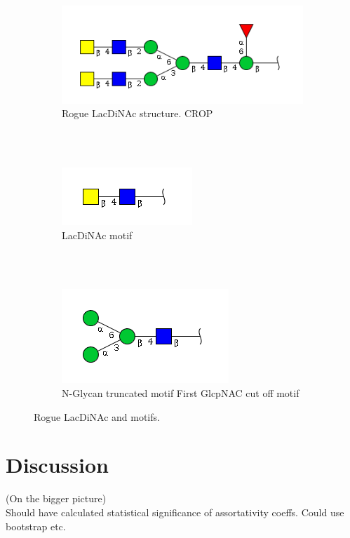 \documentclass[12pt,a4paper]{article}
\begin{document}
\begin{figure}[ht!]
    \centering
    \begin{subfigure}[t]{1.0\textwidth}
        \centering
        \includegraphics[scale=0.6]{trees/rogue_LacDiNAc_structure.png}
        \caption{Rogue LacDiNAc structure. CROP}
    \end{subfigure}%
    \\
    \bigbreak
    ~ 
	\\
    \begin{subfigure}[t]{1.0\textwidth}
        \centering
        \includegraphics[scale=0.6]{trees/LacDiNAc_motif.png}
        \caption{LacDiNAc motif}
    \end{subfigure}
    \\
    \bigbreak
    ~ 
	\\
    \begin{subfigure}[t]{1.0\textwidth}
        \centering
        \includegraphics[scale=0.6]{trees/N-Glycan_truncated_motif__First_GlcpNAC_cut_off_motif.png}
        \caption{N-Glycan truncated motif First GlcpNAC cut off motif}
    \end{subfigure}
    \caption{Rogue LacDiNAc and motifs.}
\label{fig:rogue_lacdinac}
\end{figure}


\newpage
\section{Discussion}
\label{sec:discussion}
(On the bigger picture)\\
Should have calculated statistical significance of assortativity coeffs. Could use bootstrap etc.
\end{document}
